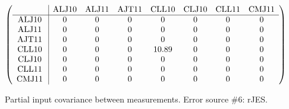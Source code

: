 \begin{table}[H]
\scriptsize
\begin{center}
\renewcommand{\arraystretch}{1.1}
\begin{math}\left(\begin{array}{c|ccccccc}
 & \mathrm{ALJ10} & 
\mathrm{ALJ11} & 
\mathrm{AJT11} & 
\mathrm{CLL10} & 
\mathrm{CLJ10} & 
\mathrm{CLL11} & 
\mathrm{CMJ11} \\
\hline
\mathrm{ALJ10} \hspace*{2pt} &  0 &  0 &  0 &  0 &  0 &  0 &  0 \\
\mathrm{ALJ11} \hspace*{2pt} &  0 &  0 &  0 &  0 &  0 &  0 &  0 \\
\mathrm{AJT11} \hspace*{2pt} &  0 &  0 &  0 &  0 &  0 &  0 &  0 \\
\mathrm{CLL10} \hspace*{2pt} &  0 &  0 &  0 &      10.89 &  0 &  0 &  0 \\
\mathrm{CLJ10} \hspace*{2pt} &  0 &  0 &  0 &  0 &  0 &  0 &  0 \\
\mathrm{CLL11} \hspace*{2pt} &  0 &  0 &  0 &  0 &  0 &  0 &  0 \\
\mathrm{CMJ11} \hspace*{2pt} &  0 &  0 &  0 &  0 &  0 &  0 &  0 \\
\end{array}\right)\end{math}
\caption{Partial input covariance between measurements. Error source \#6: rJES.}
\renewcommand{\arraystretch}{1}
\end{center}
\end{table}
